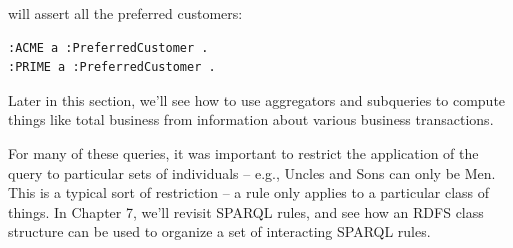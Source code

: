 will assert all the preferred customers:

\begin{lstlisting}
:ACME a :PreferredCustomer .
:PRIME a :PreferredCustomer .
\end{lstlisting}

Later in this section, we'll see how to use aggregators and subqueries
to compute things like total business from information about various
business transactions.

For many of these queries, it was important to restrict the application
of the query to particular sets of individuals -- e.g., Uncles and Sons
can only be Men. This is a typical sort of restriction -- a rule only
applies to a particular class of things. In Chapter 7, we'll revisit
SPARQL rules, and see how an RDFS class structure can be used to
organize a set of interacting SPARQL rules.


